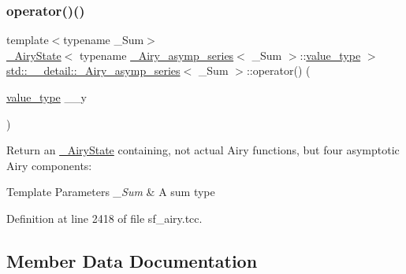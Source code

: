 \subsubsection{\texorpdfstring{operator()()}{operator()()}}
{\footnotesize\ttfamily template$<$typename \+\_\+\+Sum$>$ \\
\hyperlink{structstd_1_1____detail_1_1__AiryState}{\+\_\+\+Airy\+State}$<$ typename \hyperlink{classstd_1_1____detail_1_1__Airy__asymp__series}{\+\_\+\+Airy\+\_\+asymp\+\_\+series}$<$ \+\_\+\+Sum $>$\+::\hyperlink{classstd_1_1____detail_1_1__Airy__asymp__series_a729a698f23629a2f94b6ef71f377efc5}{value\+\_\+type} $>$ \hyperlink{classstd_1_1____detail_1_1__Airy__asymp__series}{std\+::\+\_\+\+\_\+detail\+::\+\_\+\+Airy\+\_\+asymp\+\_\+series}$<$ \+\_\+\+Sum $>$\+::operator() (\begin{DoxyParamCaption}\item[{\hyperlink{classstd_1_1____detail_1_1__Airy__asymp__series_a729a698f23629a2f94b6ef71f377efc5}{value\+\_\+type}}]{\+\_\+\+\_\+y }\end{DoxyParamCaption})}

Return an \hyperlink{structstd_1_1____detail_1_1__AiryState}{\+\_\+\+Airy\+State} containing, not actual Airy functions, but four asymptotic Airy components\+:


\begin{DoxyTemplParams}{Template Parameters}
{\em \+\_\+\+Sum} & A sum type \\
\hline
\end{DoxyTemplParams}


Definition at line 2418 of file sf\+\_\+airy.\+tcc.



\subsection{Member Data Documentation}
\mbox{\label{classstd_1_1____detail_1_1__Airy__asymp__series_a0a4d017f86429e22f5939e689e7b93ca}} 
